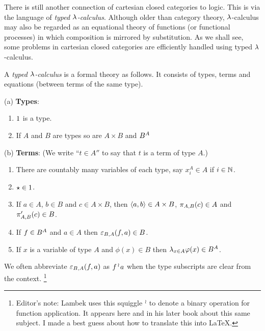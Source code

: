 There is still another connection of cartesian closed categories to logic.
This is via the language of {\em typed $\lambda$-calculus}. Although older than category
theory, $\lambda$-calculus may also be regarded as an equational theory of functions
(or functional processes) in which composition is mirrored by substitution.
As we shall see, some problems in cartesian closed categories are efficiently
handled using typed $\lambda$-calculus.

\begin{defn}
A {\em typed $\lambda$-calculus} is a formal theory as follows. It
consists of types, terms and equations (between terms of the same type).

\medskip
\noindent
(a) {\bf Types}:
\begin{enumerate}[label=(a\theenumi)]
\item $1$ is a type.
\item If $A$ and $B$ are types so are $A \times B$ and $B^{A}$
\end{enumerate}

\medskip
\noindent
(b) {\bf Terms}: (We write ``$t \in A''$ to say that $t$ is a term of type $A$.)
\begin{enumerate}[label=(b\theenumi)]
\item There are countably many variables of each type,
say $x^{A}_{i} \in A$ if $i \in \mathbb N$.
\item $\star \in 1$.
\item If $a \in A$, $b \in B$ and $c \in A \times B$, then 
$\langle a,b \rangle \in A \times B$, $\pi_{A,B}(c) \in A$ and $\pi'_{A,B}(c) \in B$.
\item If $f \in B^{A}$ and $a \in A$ then $\varepsilon_{B,A}(f,a) \in B$.
\item If $x$ is a variable of type $A$ and $\phi(x) \in B$
then $\lxa{\varphi(x)} \in \fexpBA$.
\end{enumerate}
\noindent
We often abbreviate $\varepsilon_{B,A}(f,a)$ as $f \mathop{{}^\wr}\kern-.8pt a$ when the type subscripts are clear
from the context.%
\footnote{Editor's note: Lambek uses this squiggle $\mathop{{}^\wr}\kern-.8pt$ to denote a binary operation for
function application. It appears here and in his later book about this same subject. I
made a best guess about how to translate this into \LaTeX.}


\def\lxa{\l_{x\in A}}


\end{defn}
